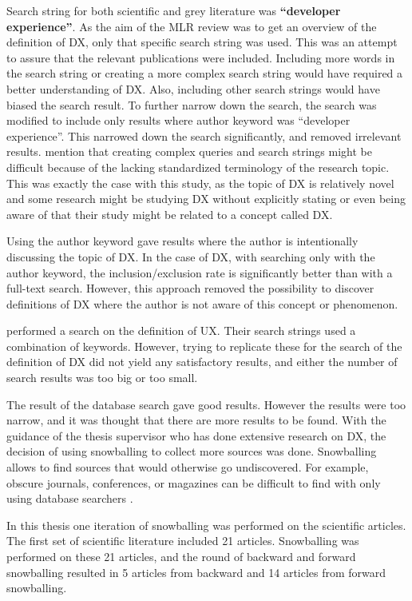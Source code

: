 \documentclass[english, 12pt, a4paper, sci, utf8, a-1b, online]{aaltothesis}
\newcounter{subsubsubsection}[subsubsection]
\begin{document}
Search string for both scientific and grey literature was \textbf{``developer experience''}. As the aim of the MLR review was to get an overview of the definition of DX, only that specific search string was used. This was an attempt to assure that the relevant publications were included. Including more words in the search string or creating a more complex search string would have required a better understanding of DX. Also, including other search strings would have biased the search result. To further narrow down the search, the search was modified to include only results where author keyword was ``developer experience''. This narrowed down the search significantly, and removed irrelevant results. \textcite{guidelines-for-snowballing} mention that creating complex queries and search strings might be difficult because of the lacking standardized terminology of the research topic. This was exactly the case with this study, as the topic of DX is relatively novel and some research might be studying DX without explicitly stating or even being aware of that their study might be related to a concept called DX.

Using the author keyword gave results where the author is intentionally discussing the topic of DX. In the case of DX, with searching only with the author keyword, the inclusion/exclusion rate is significantly better than with a full-text search. However, this approach removed the possibility to discover definitions of DX where the author is not aware of this concept or phenomenon.

\textcite{understanding-ux} performed a search on the definition of UX. Their search strings used a combination of keywords. However, trying to replicate these for the search of the definition of DX did not yield any satisfactory results, and either the number of search results was too big or too small.


The result of the database search gave good results. However the results were too narrow, and it was thought that there are more results to be found. With the guidance of the thesis supervisor who has done extensive research on DX, the decision of using snowballing to collect more sources was done. Snowballing allows to find sources that would otherwise go undiscovered. For example, obscure journals, conferences, or magazines can be difficult to find with only using database searchers \parencite{guidelines-for-snowballing}.

In this thesis one iteration of snowballing was performed on the scientific articles. The first set of scientific literature included 21 articles. Snowballing was performed on these 21 articles, and the round of backward and forward snowballing resulted in 5 articles from backward and 14 articles from forward snowballing.
\end{document}
